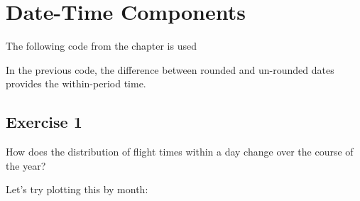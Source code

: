 \documentclass[]{book}
\newenvironment{Shaded}{\begin{snugshade}}{\end{snugshade}}
\newcommand{\DataTypeTok}[1]{\textcolor[rgb]{0.13,0.29,0.53}{#1}}
\newcommand{\DecValTok}[1]{\textcolor[rgb]{0.00,0.00,0.81}{#1}}
\newcommand{\KeywordTok}[1]{\textcolor[rgb]{0.13,0.29,0.53}{\textbf{#1}}}
\newcommand{\NormalTok}[1]{#1}
\newcommand{\OperatorTok}[1]{\textcolor[rgb]{0.81,0.36,0.00}{\textbf{#1}}}
\newcommand{\OtherTok}[1]{\textcolor[rgb]{0.56,0.35,0.01}{#1}}
\newcommand{\StringTok}[1]{\textcolor[rgb]{0.31,0.60,0.02}{#1}}
\theoremstyle{definition}
\theoremstyle{definition}
\theoremstyle{definition}
\theoremstyle{remark}
\begin{document}
\hypertarget{date-time-components}{%
\section{Date-Time Components}\label{date-time-components}}

The following code from the chapter is used

\begin{Shaded}
\end{Shaded}

In the previous code, the difference between rounded and un-rounded
dates provides the within-period time.

\hypertarget{exercise-1-42}{%
\subsection{Exercise 1}\label{exercise-1-42}}

How does the distribution of flight times within a day change over the
course of the year?

Let's try plotting this by month:

\begin{Shaded}
\end{Shaded}
\end{document}
